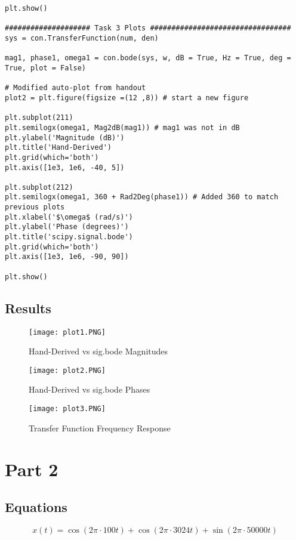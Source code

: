 \begin{scriptsize}
\begin{lstlisting}
plt.show()

#################### Task 3 Plots #################################
sys = con.TransferFunction(num, den)

mag1, phase1, omega1 = con.bode(sys, w, dB = True, Hz = True, deg = True, plot = False) 

# Modified auto-plot from handout
plot2 = plt.figure(figsize =(12 ,8)) # start a new figure

plt.subplot(211)
plt.semilogx(omega1, Mag2dB(mag1)) # mag1 was not in dB
plt.ylabel('Magnitude (dB)')
plt.title('Hand-Derived')
plt.grid(which='both')
plt.axis([1e3, 1e6, -40, 5])

plt.subplot(212)
plt.semilogx(omega1, 360 + Rad2Deg(phase1)) # Added 360 to match previous plots
plt.xlabel('$\omega$ (rad/s)') 
plt.ylabel('Phase (degrees)')
plt.title('scipy.signal.bode')
plt.grid(which='both')
plt.axis([1e3, 1e6, -90, 90])

plt.show()
\end{lstlisting}
\end{scriptsize}

\subsection{Results}

\begin{figure}[H]
   	\centering
   	\texttt{[image: plot1.PNG]}
   	\caption{Hand-Derived vs sig.bode Magnitudes}
\end{figure}
 
\begin{figure}[H]
    \centering
    \texttt{[image: plot2.PNG]}
   	\caption{Hand-Derived vs sig.bode Phases}
\end{figure}
  
\begin{figure}[H]
   	\centering
   	\texttt{[image: plot3.PNG]}
   	\caption{Transfer Function Frequency Response}
\end{figure}
 


\section{Part 2}
\subsection{Equations}
\[x(t)=\cos(2\pi \cdot 100t)+\cos(2\pi \cdot 3024t)+\sin(2\pi \cdot 50000t)\]
